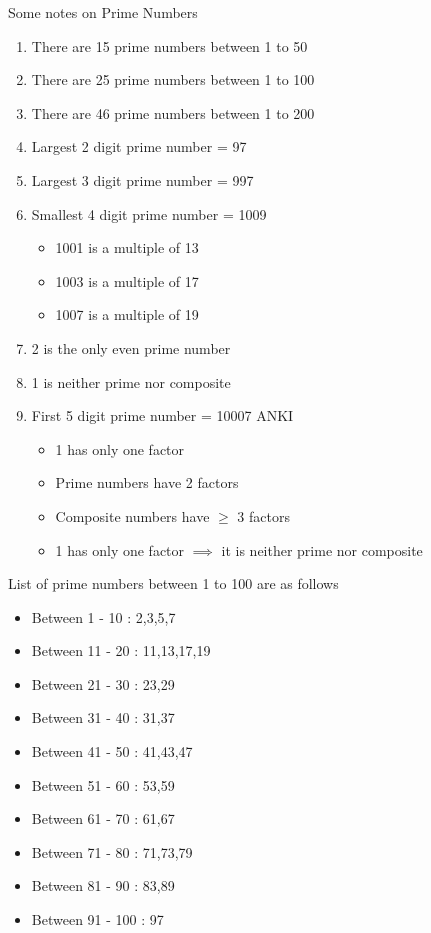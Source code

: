 Some notes on Prime Numbers
\begin{enumerate}
    \item There are 15 prime numbers between 1 to 50
    \item There are 25 prime numbers between 1 to 100
    \item There are 46 prime numbers between 1 to 200
    \item Largest 2 digit prime number = 97
    \item Largest 3 digit prime number = 997
    \item Smallest 4 digit prime number = 1009
    \begin{itemize}
        \item 1001 is a multiple of 13
        \item 1003 is a multiple of 17
        \item 1007 is a multiple of 19
    \end{itemize}
    \item 2 is the only even prime number
    \item 1 is neither prime nor composite
    \item First 5 digit prime number = 10007 {ANKI}
    \begin{itemize}
        \item 1 has only one factor
        \item Prime numbers have 2 factors
        \item Composite numbers have $\geq$ 3 factors
        \item 1 has only one factor $\implies$ it is neither prime nor composite
    \end{itemize}

\end{enumerate}

\begin{NOTE}
    List of prime numbers between 1 to 100 are as follows
    \begin{itemize}
        \item Between 1 - 10 : 2,3,5,7
        \item Between 11 - 20 : 11,13,17,19
        \item Between 21 - 30 : 23,29
        \item Between 31 - 40 : 31,37
        \item Between 41 - 50 : 41,43,47
        \item Between 51 - 60 : 53,59
        \item Between 61 - 70 : 61,67
        \item Between 71 - 80 : 71,73,79
        \item Between 81 - 90 : 83,89
        \item Between 91 - 100 : 97
    \end{itemize}
\end{NOTE}


